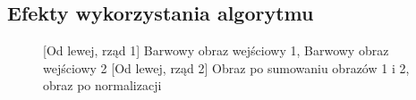 \documentclass[a4paper,12pt, titlepage]{report}
\begin{document}
\subsection*{Efekty wykorzystania algorytmu}
\begin{figure}[h]
    \centering
    \qquad
    \caption{[Od lewej, rząd 1] Barwowy obraz wejściowy 1, Barwowy obraz wejściowy 2 [Od lewej, rząd 2] Obraz po sumowaniu obrazów 1 i 2, obraz po normalizacji}%
    \label{fig:rysunek}%
\end{figure}
\end{document}
